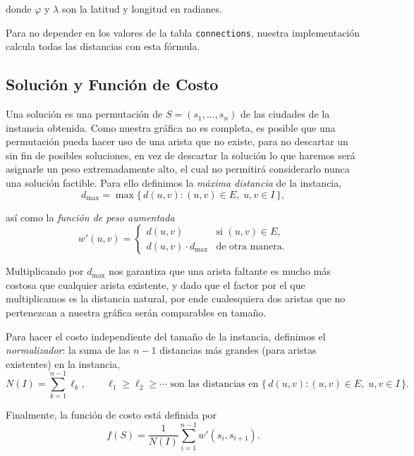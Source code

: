 \documentclass[11pt,letterpaper]{article}
\begin{document}
donde $\varphi$ y $\lambda$ son la latitud y longitud en radianes.

Para no depender en los valores de la tabla \texttt{connections}, nuestra implementación calcula todas las distancias con esta fórmula.

\subsection{Solución y Función de Costo}
Una solución es una permutación de $S = (s_1, \dots, s_n)$ de las ciudades de la instancia obtenida. Como nuestra gráfica no es completa, es posible que una permutación pueda hacer uso de una arista que no existe, para no descartar un sin fin de posibles soluciones, en vez de descartar la solución lo que haremos será asignarle un peso extremadamente alto, el cual no permitirá considerarlo nunca una solución factible. Para ello definimos la \emph{máxima distancia} de la instancia,
\begin{equation}
  d_{\max} = \max \{\, d(u, v) : (u, v) \in E,\; u, v \in I \,\},
\end{equation}

así como la \emph{función de peso aumentada}
\begin{equation}
  w'(u, v) =
  \begin{cases}
    d(u, v)               & \text{si } (u, v) \in E, \\
    d(u, v) \cdot d_{\max} & \text{de otra manera.}
  \end{cases}
\end{equation}

Multiplicando por $d_{\max}$ nos garantiza que una arista faltante es mucho más costosa que cualquier arista existente, y dado que el factor por el que multiplicamos es la distancia natural, por ende cualesquiera dos aristas que no pertenezcan a nuestra gráfica serán comparables en tamaño.

Para hacer el costo independiente del tamaño de la instancia, definimos el \emph{normalizador}: la suma de las $n-1$ distancias más grandes (para aristas existentes) en la instancia,
\begin{equation}
  N(I) = \sum_{k=1}^{n-1} \ell_k,
  \qquad \ell_1 \ge \ell_2 \ge \cdots \text{ son las distancias en }
  \{\, d(u,v) : (u,v) \in E,\; u,v \in I \,\}.
\end{equation}

Finalmente, la función de costo está definida por
\begin{equation}
  f(S) = \frac{1}{N(I)} \sum_{i=1}^{n-1} w'(s_i, s_{i+1}).
  \label{eq:cost}
\end{equation}
\end{document}
